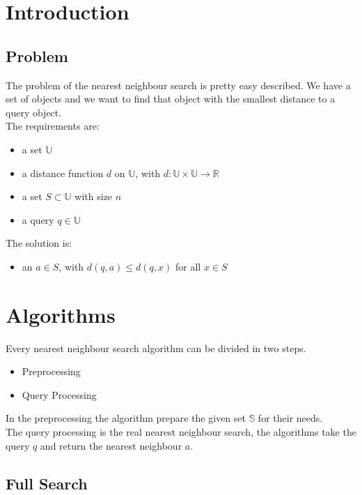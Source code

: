 \documentclass[runningheads,a4paper]{llncs}
\begin{document}
\tableofcontents
{}

\newpage
{}

\section{Introduction}

\subsection{Problem}

The problem of the nearest neighbour search is pretty easy described. We have a set of objects and we want to find that
object with the smallest distance to a query object.\\
The requirements are:
\begin{itemize}
	\item a set $\mathbb{U}$
	\item a distance function $d$ on $\mathbb{U}$, with $d: \mathbb{U} \times \mathbb{U} \to \mathbb{R}$
	\item a set $S \subset \mathbb{U}$ with size $n$
	\item a query $q \in \mathbb{U}$
\end{itemize}
The solution is:
\begin{itemize}
	\item an $a \in S$, with $d(q, a) \le d(q, x)$ for all $x \in S$
\end{itemize}

\section{Algorithms}

Every nearest neighbour search algorithm can be divided in two steps.
\begin{itemize}
	\item Preprocessing
	\item Query Processing
\end{itemize}
In the preprocessing the algorithm prepare the given set $\mathbb{S}$ for
their needs.\\
The query processing is the real nearest neighbour search, the algorithms take the query $q$ and return the nearest
neighbour $a$.

\subsection{Full Search}
\end{document}
